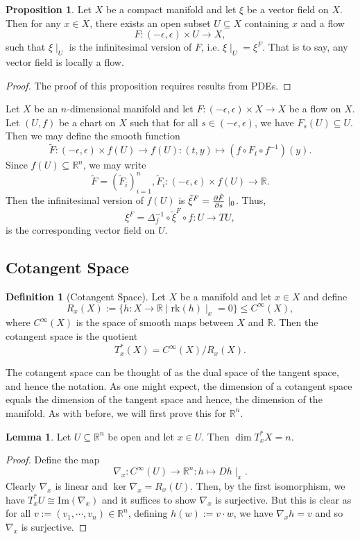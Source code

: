 \documentclass[]{article}
\theoremstyle{definition}
\theoremstyle{definition}
\newtheorem{definition}{Definition}[section]
\newtheorem{lemma}{Lemma}[section]
\newtheorem{proposition}{Proposition}[section]
\begin{document}
\begin{proposition}
  Let \(X\) be a compact manifold and let \(\xi\) be a vector field on \(X\). 
  Then for any \(x \in X\), there exists an open subset \(U \subseteq X\) 
  containing \(x\) and a flow 
  \[F : (-\epsilon, \epsilon) \times U \to X,\]
  such that \(\xi\mid_U\) is the infinitesimal version of \(F\), i.e. 
  \(\xi\mid_U = \xi^F\). That is to say, any vector field is locally a 
  flow.
\end{proposition}
\begin{proof}
  The proof of this proposition requires results from PDEs.
\end{proof}

Let \(X\) be an \(n\)-dimensional manifold and let 
\(F : (-\epsilon, \epsilon) \times X \to X\) be a flow on \(X\). Let 
\((U, f)\) be a chart on \(X\) such that for all \(s \in (-\epsilon, \epsilon)\),
we have \(F_s(U) \subseteq U\). Then we may define the smooth function
\[\tilde F : (-\epsilon, \epsilon) \times f(U) \to f(U) :
 (t, y) \mapsto (f \circ F_t \circ f^{-1})(y).\]
Since \(f(U) \subseteq \mathbb{R}^n\), we may write 
\[\tilde F = (\tilde F_i)_{i = 1}^n, 
  \tilde F_i : (-\epsilon, \epsilon) \times f(U) \to \mathbb{R}.\]
Then the infinitesimal version of \(f(U)\) is 
\(\tilde \xi^F = \pdv{\tilde F}{s}\mid_0\). Thus, 
\[\xi^F = \Delta_f^{-1} \circ \tilde \xi^F \circ f : U \to TU,\]
is the corresponding vector field on \(U\).

\subsection{Cotangent Space}

\begin{definition}[Cotangent Space]
  Let \(X\) be a manifold and let \(x \in X\) and define 
  \[R_x(X) := \{h : X \to \mathbb{R} \mid \text{rk}(h)\mid_x = 0\} \le C^\infty(X),\]
  where \(C^\infty(X)\) is the space of smooth maps between \(X\) and 
  \(\mathbb{R}\). Then the cotangent space is the quotient 
  \[T^*_x(X) = C^\infty(X) / R_x(X).\]
\end{definition}

The cotangent space can be thought of as the dual space of the tangent space, 
and hence the notation. As one might expect, the dimension of a cotangent space 
equals the dimension of the tangent space and hence, the dimension of the 
manifold. As with before, we will first prove this for \(\mathbb{R}^n\).

\begin{lemma}
  Let \(U \subseteq \mathbb{R}^n\) be open and let \(x \in U\). Then 
  \(\dim T^*_x X = n\).
\end{lemma}
\begin{proof}
  Define the map 
  \[\nabla_x : C^\infty(U) \to \mathbb{R}^n : h \mapsto Dh\mid_x.\]
  Clearly \(\nabla_x\) is linear and \(\ker \nabla_x = R_x(U)\).
  Then, by the first isomorphism, we have \(T^*_x U \cong \text{Im}(\nabla_x)\) 
  and it suffices to show \(\nabla_x\) is surjective. But this is clear as 
  for all \(v := (v_1, \cdots, v_n) \in \mathbb{R}^n\), defining \(h(w) := v \cdot w\), 
  we have \(\nabla_x h = v\) and so \(\nabla_x\) is surjective. 
\end{proof}
\end{document}
